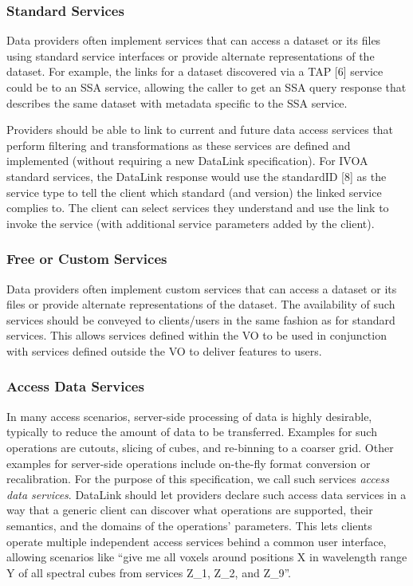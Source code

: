 \documentclass[11pt,a4paper]{ivoa}
\begin{document}
\subsubsection{Standard Services}

Data providers often implement services that can access a dataset
or its files using standard service interfaces or provide alternate
representations of the dataset. For example, the links for a dataset
discovered via a TAP [6] service could be to an SSA service, allowing
the caller to get an SSA query response that describes the same dataset
with metadata specific to the SSA service.

Providers should be able to link to current and future data
access services that perform filtering and transformations as these
services are defined and implemented (without requiring a new DataLink
specification). For IVOA standard services, the DataLink response would
use the standardID [8] as the service type to tell the client which
standard (and version) the linked service complies to. The client can
select services they understand and use the link to invoke the service
(with additional service parameters added by the client).


\subsubsection{Free or Custom Services}

Data providers often implement custom services that can access a dataset
or its files or provide alternate representations of the dataset. The
availability of such services should be conveyed to clients/users in
the same fashion as for standard services. This allows services defined
within the VO to be used in conjunction with services defined outside
the VO to deliver features to users.


\subsubsection{Access Data Services}

In many access scenarios, server-side processing of data is
highly desirable, typically to reduce the amount of data to be
transferred. Examples for such operations are cutouts, slicing of
cubes, and re-binning to a coarser grid. Other examples for server-side
operations include on-the-fly format conversion or recalibration. For
the purpose of this specification, we call such services
{\em access data services}.
DataLink should let providers declare such access data services
in a way that a generic client can discover what operations are supported,
their semantics, and the domains of the operations' parameters. This lets
clients operate multiple independent access services behind a common user
interface, allowing scenarios like ``give me all voxels around positions
X in wavelength range Y of all spectral cubes from services Z\_1, Z\_2,
and Z\_9''.
\end{document}

